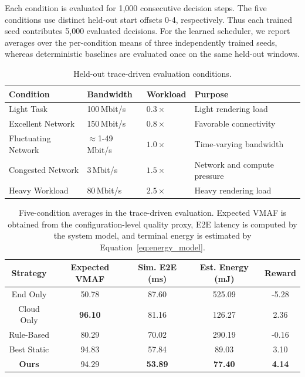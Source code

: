 \documentclass[acmsmall]{acmart}
\begin{document}
	Each condition is evaluated for 1,000 consecutive decision steps. The five conditions use distinct held-out start offsets 0-4, respectively. Thus each trained seed contributes 5,000 evaluated decisions. For the learned scheduler, we report averages over the per-condition means of three independently trained seeds, whereas deterministic baselines are evaluated once on the same held-out windows.
	\begin{table}[hbp]
		\centering
		\caption{Held-out trace-driven evaluation conditions.}
		\label{tab:eval_conditions}
		\scriptsize
		\setlength{\tabcolsep}{4pt}
		\begin{tabular}{llll}
			\toprule
			\textbf{Condition} & \textbf{Bandwidth} & \textbf{Workload} & \textbf{Purpose} \\
			\midrule
			Light Task & 100\,Mbit/s & $0.3\times$ & Light rendering load \\
			Excellent Network & 150\,Mbit/s & $0.8\times$ & Favorable connectivity \\
			Fluctuating Network & $\approx$1-49\,Mbit/s & $1.0\times$ & Time-varying bandwidth \\
			Congested Network & 3\,Mbit/s & $1.5\times$ & Network and compute pressure \\
			Heavy Workload & 80\,Mbit/s & $2.5\times$ & Heavy rendering load \\
			\bottomrule
		\end{tabular}
	\end{table}

	\begin{table}[hbp]
		\centering
		\caption{Five-condition averages in the trace-driven evaluation. Expected VMAF is obtained from the configuration-level quality proxy, E2E latency is computed by the system model, and terminal energy is estimated by Equation~\ref{eq:energy_model}.}
		\label{tab:quantitative}
		\scriptsize
		\setlength{\tabcolsep}{4.0pt}
		\renewcommand{\arraystretch}{0.95}
		\begin{tabular*}{\linewidth}{@{\extracolsep{\fill}}ccccc@{}}
			\toprule
			\textbf{Strategy} & \textbf{Expected VMAF} & \textbf{Sim. E2E (ms)} &
			\textbf{Est. Energy (mJ)} & \textbf{Reward} \\
			\midrule
			End Only & 50.78 & 87.60 & 525.09 & -5.28 \\
			Cloud Only & \textbf{96.10} & 81.16 & 126.27 & 2.36 \\
			Rule-Based & 80.29 & 70.02 & 290.19 & -0.16 \\
			Best Static & 94.83 & 57.84 & 89.03 & 3.10 \\
			\textbf{Ours} & 94.29 & \textbf{53.89} & \textbf{77.40} & \textbf{4.14} \\
			\bottomrule
		\end{tabular*}
	\end{table}
\end{document}
